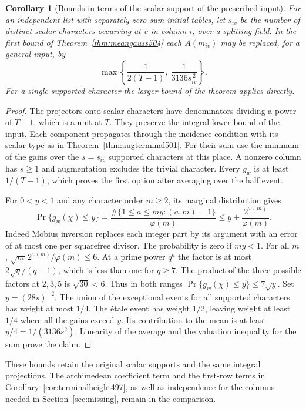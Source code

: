\documentclass[a4paper,11pt]{article}
\newtheorem{corollary}[proposition]{Corollary}
\theoremstyle{definition}
\theoremstyle{remark}
\numberwithin{equation}{section}
\begin{document}
\begin{corollary}[Bounds in terms of the scalar support of the prescribed input]\leavevmode
\label{cor:packetsave504}
For an independent list with separately zero-sum initial tables,
let \(s_{iv}\) be the number of distinct scalar characters
occurring at \(v\) in column \(i\), over a splitting field.
In the first bound of Theorem~\ref{thm:meangauss504} each
\(A(m_{iv})\) may be replaced, for a general input, by
\[
       \max\left\{\frac{1}{2(T-1)},\
                           \frac{1}{3136s_{iv}^{\,2}}\right\}.
\]
For a single supported character the larger bound of the
theorem applies directly.
\end{corollary}
\begin{proof}
The projectors onto scalar characters have denominators dividing
a power of \(T-1\), which is a unit at \(T\). They preserve the
integral lower bound of the input. Each component propagates
through the incidence condition with its scalar type as in
Theorem~\ref{thm:augterminal501}. For their sum use the minimum
of the gains over the \(s=s_{iv}\) supported characters at this
place. A nonzero column has \(s\ge1\) and augmentation excludes the
trivial character. Every \(g_w\) is at least \(1/(T-1)\), which
proves the first option after averaging over the half event.

For \(0<y<1\) and any character order \(m\ge2\), its marginal
distribution gives
\[
 \Pr\{g_w(\chi)\le y\}
  =\frac{\#\{1\le a\le my:(a,m)=1\}}{\varphi(m)}
  \le y+\frac{2^{\omega(m)}}{\varphi(m)} .
\]
Indeed M\"obius inversion replaces each integer part by its
argument with an error of at most one per squarefree divisor.
The probability is zero if \(my<1\). For all \(m\),
\(\sqrt{m}\,2^{\omega(m)}/\varphi(m)\le6\). At a prime power
\(q^a\) the factor is at most \(2\sqrt q/(q-1)\), which is
less than one for \(q\ge7\). The product of the three possible
factors at \(2,3,5\) is \(\sqrt{30}<6\).
Thus in both ranges \(\Pr\{g_w(\chi)\le y\}\le7\sqrt y\).
Set \(y=(28s)^{-2}\). The union of the exceptional events
for all supported characters has weight at most \(1/4\).
The \'etale event has weight \(1/2\), leaving weight at least
\(1/4\) where all the gains exceed \(y\). Its contribution to
the mean is at least \(y/4=1/(3136s^2)\). Linearity of the
average and the valuation inequality for the sum prove the claim.
\end{proof}

These bounds retain the original scalar supports and the same
integral projections. The archimedean coefficient term and the
first-row terms in Corollary~\ref{cor:terminalheight497}, as
well as independence for the columns needed in
Section~\ref{sec:missing}, remain in the comparison.
\end{document}
